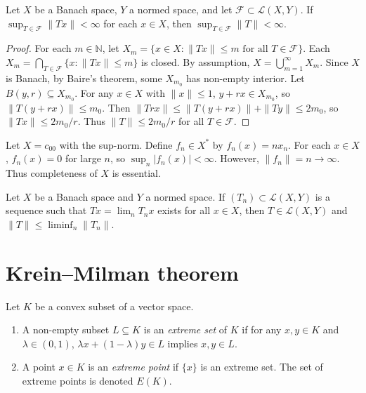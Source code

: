 \begin{theorem}
\label{theorem-banach-steinhaus}
Let $X$ be a Banach space, $Y$ a normed
space, and let $\mathcal F \subset \mathcal
L(X,Y)$. If $\sup_{T \in \mathcal F} \|Tx\| <
\infty$ for each $x \in X$, then $\sup_{T \in
\mathcal F} \|T\| < \infty$.
\end{theorem}

\begin{proof}
For each $m \in \mathbb{N}$, let $X_m = \{ x
\in X : \|Tx\| \leq m \text{ for all } T \in
\mathcal F \}$. Each $X_m = \bigcap_{T \in
\mathcal F} \{x : \|Tx\| \leq m\}$ is closed.
By assumption, $X = \bigcup_{m=1}^\infty
X_m$. Since $X$ is Banach, by Baire's
theorem, some $X_{m_0}$ has non-empty
interior. Let $B(y, r) \subseteq X_{m_0}$.
For any $x \in X$ with $\|x\| \leq 1$, $y+rx
\in X_{m_0}$, so $\|T(y+rx)\| \leq m_0$. Then
$\|Trx\| \leq \|T(y+rx)\| + \|Ty\| \leq
2m_0$, so $\|Tx\| \leq 2m_0/r$. Thus $\|T\|
\leq 2m_0/r$ for all $T \in \mathcal F$.
\end{proof}

\begin{example}
\label{example-completeness-necessary-bs}
Let $X = c_{00}$ with the sup-norm. Define
$f_n \in X^*$ by $f_n(x) = n x_n$. For each
$x \in X$, $f_n(x) = 0$ for large $n$, so
$\sup_n |f_n(x)| < \infty$. However, $\|f_n\|
= n \to \infty$. Thus completeness of $X$ is
essential.
\end{example}

\begin{lemma}
\label{lemma-pointwise-limit-linear}
Let $X$ be a Banach space and $Y$ a normed
space. If $(T_n) \subset \mathcal L(X,Y)$ is
a sequence such that $Tx = \lim_n T_n x$
exists for all $x \in X$, then $T \in
\mathcal L(X,Y)$ and $\|T\| \leq \liminf_n
\|T_n\|$.
\end{lemma}

\section{Krein--Milman theorem}
\label{section-krein-milman}

\begin{definition}
\label{definition-extreme-point}
Let $K$ be a convex subset of a vector space.
\begin{enumerate}
\item A non-empty subset $L \subseteq K$ is
an {\it extreme set} of $K$ if for any $x, y
\in K$ and $\lambda \in (0,1)$, $\lambda x +
(1-\lambda)y \in L$ implies $x, y \in L$.
\item A point $x \in K$ is an {\it extreme
point} if $\{x\}$ is an extreme set. The set
of extreme points is denoted $E(K)$.
\end{enumerate}
\end{definition}

